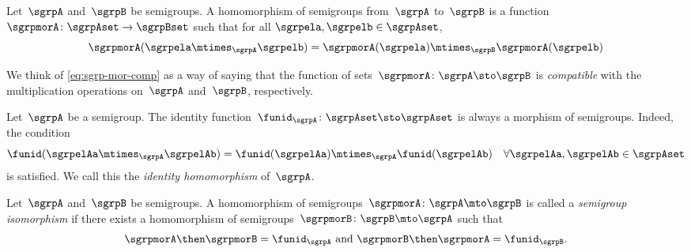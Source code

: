 

\section{\wHomos}

\begin{ctdefinition}
  \label{def:semigroup-mor}
  Let~$\sgrpA$ and~$\sgrpB$ be semigroups. A homomorphism of semigroups from~$\sgrpA$ to~$\sgrpB$ is a function~$\sgrpmorA\colon \sgrpAset \to \sgrpBset$ such that for all $\sgrpela, \sgrpelb \in \sgrpAset$,
  \begin{equation}
    \label{eq:sgrp-mor-comp}
    \sgrpmorA(\sgrpela \mtimes_{\sgrpA} \sgrpelb) = \sgrpmorA (\sgrpela) \mtimes_{\sgrpB} \sgrpmorA(\sgrpelb)
  \end{equation}

\end{ctdefinition}

We think of   \cref{eq:sgrp-mor-comp} as a way of saying that the function of sets~$\sgrpmorA\colon \sgrpA \sto \sgrpB$  is \emph{compatible} with the multiplication operations on~$\sgrpA$ and~$\sgrpB$, respectively.

\begin{ctdefinition}
  \label{def:identity-sgrp-mor}
  Let~$\sgrpA$ be a semigroup.
  The identity function~$\funid_\sgrpA\colon \sgrpAset \sto \sgrpAset$ is always a morphism of semigroups.
  Indeed, the condition
  \begin{equation}
    \funid (\sgrpelAa \mtimes_{\sgrpA} \sgrpelAb) = \funid (\sgrpelAa) \mtimes_{\sgrpA} \funid(\sgrpelAb) \quad \forall \sgrpelAa, \sgrpelAb \in \sgrpAset
  \end{equation}
  is satisfied. We call this the \emph{identity homomorphism} of~$\sgrpA$.
\end{ctdefinition}



\begin{ctdefinition}
  \label{def:semigroup-iso}
  Let~$\sgrpA$ and~$\sgrpB$ be semigroups.
  A homomorphism of semigroups~$\sgrpmorA\colon \sgrpA \mto \sgrpB$ is called a \emph{semigroup isomorphism} if there exists a homomorphism of semigroups~$\sgrpmorB\colon \sgrpB \mto \sgrpA$ such that
  \begin{equation}
    \label{eq:sgrp-iso-cond}
    \sgrpmorA \then \sgrpmorB = \funid_\sgrpA \text{ and }  \sgrpmorB \then \sgrpmorA = \funid_\sgrpB.
  \end{equation}
\end{ctdefinition}


